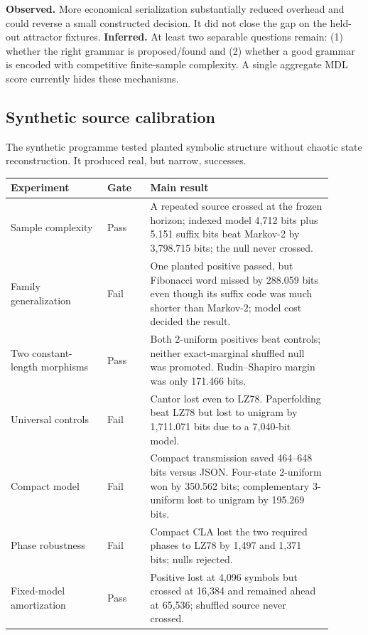 \documentclass[10pt]{article}
\newcommand{\obs}{\textbf{Observed.}}
\newcommand{\inferd}{\textbf{Inferred.}}
\begin{document}
\obs{} More economical serialization substantially reduced overhead and could
reverse a small constructed decision. It did not close the gap on the
held-out attractor fixtures. \inferd{} At least two separable questions remain:
(1) whether the right grammar is proposed/found and (2) whether a good grammar
is encoded with competitive finite-sample complexity. A single aggregate MDL
score currently hides these mechanisms.

\subsection{Synthetic source calibration}

The synthetic programme tested planted symbolic structure without chaotic
state reconstruction. It produced real, but narrow, successes.

\begin{longtable}{p{0.27\linewidth}p{0.12\linewidth}p{0.51\linewidth}}
\toprule
Experiment & Gate & Main result \\
\midrule
\endhead
Sample complexity & Pass & A repeated source crossed at the frozen horizon;
indexed model 4,712 bits plus 5.151 suffix bits beat Markov-2 by 3,798.715
bits; the null never crossed. \\
Family generalization & Fail & One planted positive passed, but Fibonacci word
missed by 288.059 bits even though its suffix code was much shorter than
Markov-2; model cost decided the result. \\
Two constant-length morphisms & Pass & Both 2-uniform positives beat controls;
neither exact-marginal shuffled null was promoted. Rudin--Shapiro margin was
only 171.466 bits. \\
Universal controls & Fail & Cantor lost even to LZ78. Paperfolding beat LZ78
but lost to unigram by 1,711.071 bits due to a 7,040-bit model. \\
Compact model & Fail & Compact transmission saved 464--648 bits versus JSON.
Four-state 2-uniform won by 350.562 bits; complementary 3-uniform lost to
unigram by 195.269 bits. \\
Phase robustness & Fail & Compact CLA lost the two required phases to LZ78 by
1,497 and 1,371 bits; nulls rejected. \\
Fixed-model amortization & Pass & Positive lost at 4,096 symbols but crossed
at 16,384 and remained ahead at 65,536; shuffled source never crossed. \\
\bottomrule
\end{longtable}
\end{document}
